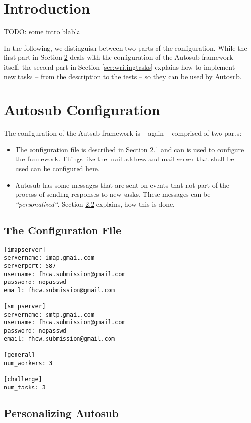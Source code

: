 \section{Introduction}

TODO: some intro blabla


In the following, we distinguish between two parts of the configuration.
While the first part in Section \ref{sec:confautosub} deals with the configuration
of the Autosub framework itself, the second part in Section \ref{sec:writingtasks}
explains how to implement new tasks -- from the description to the tests -- so they
can be used by Autosub.


\cleardoublepage
\section{Autosub Configuration}\label{sec:confautosub}

The configuration of the Autsub framework is -- again -- comprised of two parts:

\begin{itemize}
\item The configuration file is described in Section \ref{sec:conffile} and can
is used to configure the framework. Things like the mail address and mail server
that shall be used can be configured here.
\item Autosub has some messages that are sent on events that not part of the
process of sending responses to new tasks. These messages can be {\it ``personalized``}.
Section \ref{sec:personal} explains, how this is done.
\end{itemize}

\subsection{The Configuration File}\label{sec:conffile}

\begin{verbatim}
[imapserver]
servername: imap.gmail.com
serverport: 587
username: fhcw.submission@gmail.com
password: nopasswd
email: fhcw.submission@gmail.com

[smtpserver]
servername: smtp.gmail.com
username: fhcw.submission@gmail.com
password: nopasswd
email: fhcw.submission@gmail.com

[general]
num_workers: 3

[challenge]
num_tasks: 3
\end{verbatim}

\subsection{Personalizing Autosub}\label{sec:personal}

